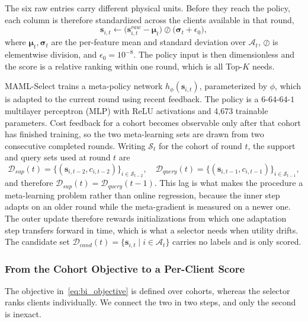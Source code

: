 \documentclass[journal]{IEEEtran}
\theoremstyle{remark}
\newcommand{\revision}[1]{#1}
\newcommand{\revtwo}[1]{#1}
\newcommand{\revtwoeq}{}
\begin{document}
\revtwo{The six raw entries carry different physical units. Before they reach the policy, each column is therefore standardized across the clients available in that round,}
\begin{equation}
	\revtwoeq
	\bm{s}_{i,t} \leftarrow \bigl(\bm{s}^{raw}_{i,t}-\bm{\mu}_t\bigr)\oslash\bigl(\bm{\sigma}_t+\epsilon_0\bigr),
	\label{eq:zscore}
\end{equation}
\revtwo{where $\bm{\mu}_t,\bm{\sigma}_t$ are the per-feature mean and standard deviation over $\mathcal{A}_t$, $\oslash$ is elementwise division, and $\epsilon_0=10^{-8}$. The policy input is then dimensionless and the score is a relative ranking within one round, which is all Top-$K$ needs.}

MAML-Select trains a meta-policy network $h_\phi(\bm{s}_{i,t})$, parameterized by $\phi$, which is adapted to the current round using recent feedback. \revision{The policy is a $6$-$64$-$64$-$1$ multilayer perceptron (MLP) with ReLU activations and 4,673 trainable parameters.} \revtwo{Cost feedback for a cohort becomes observable only after that cohort has finished training, so the two meta-learning sets are drawn from two consecutive completed rounds. Writing $\mathcal{S}_t$ for the cohort of round $t$, the support and query sets used at round $t$ are}
\begin{equation}
	\revtwoeq \mathcal{D}_{sup}(t) = \bigl\{(\bm{s}_{i,t-2},c_{i,t-2})\bigr\}_{i\in\mathcal{S}_{t-2}},\quad
	\mathcal{D}_{query}(t) = \bigl\{(\bm{s}_{i,t-1},c_{i,t-1})\bigr\}_{i\in\mathcal{S}_{t-1}} ,
	\label{eq:sets}
\end{equation}
\revtwo{and therefore $\mathcal{D}_{sup}(t)=\mathcal{D}_{query}(t-1)$. This lag is what makes the procedure a meta-learning problem rather than online regression, because the inner step adapts on an older round while the meta-gradient is measured on a newer one. The outer update therefore rewards initializations from which one adaptation step transfers forward in time, which is what a selector needs when utility drifts. The candidate set $\mathcal{D}_{cand}(t)=\{\bm{s}_{i,t}\mid i\in\mathcal{A}_t\}$ carries no labels and is only scored.}

\subsubsection{\revtwo{From the Cohort Objective to a Per-Client Score}}
\revtwo{The objective in~\eqref{eq:bi_objective} is defined over cohorts, whereas the selector ranks clients individually. We connect the two in two steps, and only the second is inexact.}
\end{document}
